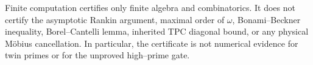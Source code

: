Finite computation certifies only finite algebra and combinatorics.  It
does not certify the asymptotic Rankin argument, maximal order of
\(\omega\), Bonami--Beckner inequality, Borel--Cantelli lemma, inherited
TPC diagonal bound, or any physical M\"obius cancellation.  In
particular, the certificate is not numerical evidence for twin primes
or for the unproved high--prime gate.
